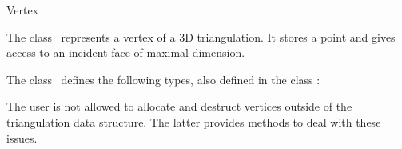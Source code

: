 

\begin{ccRefClass}{Vertex}  %


\ccDefinition
  
The class \ccRefName\ represents a vertex of a 3D triangulation. 
It stores a point and gives access to an incident face of 
maximal dimension.

\ccInheritsFrom
{}

\ccTypes
{}
\ccThreeToTwo
The class \ccClassTemplateName\ defines the following types, also
defined in the class :

\ccGlue
{}
\ccGlue
{}


\begin{ccAdvanced}
\ccCreation

The user is not allowed to allocate and destruct vertices outside of the
triangulation data structure. The latter provides methods to deal with these
issues. 




\end{ccAdvanced}
\end{ccRefClass}
